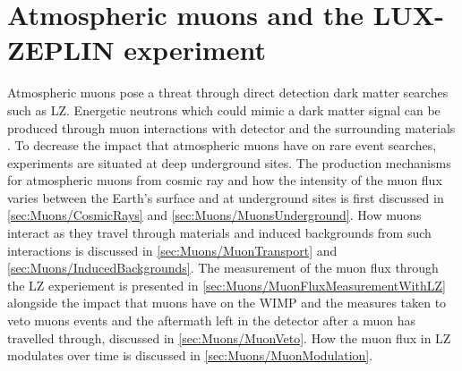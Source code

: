 \chapter{Atmospheric muons and the LUX-ZEPLIN experiment}\label{chap:Muons}
Atmospheric muons pose a threat through direct detection dark matter searches such as LZ. Energetic neutrons which could mimic a dark matter signal can be produced through muon interactions with detector and the surrounding materials \cite{LZ_SIMS}. To decrease the impact that atmospheric muons have on rare event searches, experiments are situated at deep underground sites. 
The production mechanisms for atmospheric muons from cosmic ray and how the intensity of the muon flux varies between the Earth's surface and at underground sites is first discussed in \autoref{sec:Muons/CosmicRays} and \autoref{sec:Muons/MuonsUnderground}. How muons interact as they travel through materials and induced backgrounds from such interactions is discussed in \autoref{sec:Muons/MuonTransport} and \autoref{sec:Muons/InducedBackgrounds}. The measurement of the muon flux through the LZ experiement is presented in \autoref{sec:Muons/MuonFluxMeasurementWithLZ} alongside the impact that muons have on the WIMP and the measures taken to veto muons events and the aftermath left in the detector after a muon has travelled through, discussed in \autoref{sec:Muons/MuonVeto}. How the muon flux in LZ modulates over time is discussed in \autoref{sec:Muons/MuonModulation}.


